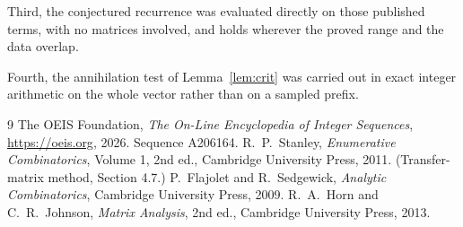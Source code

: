 \documentclass[11pt,a4paper]{article}
\theoremstyle{plain}
\theoremstyle{definition}
\begin{document}
Third, the conjectured recurrence was evaluated directly on those published terms, with no
matrices involved, and holds wherever the proved range and the data overlap.

Fourth, the annihilation test of Lemma~\ref{lem:crit} was carried out in exact integer
arithmetic on the whole vector rather than on a sampled prefix.

\begin{thebibliography}{9}
 The OEIS Foundation, \emph{The On-Line Encyclopedia of Integer
Sequences}, \url{https://oeis.org}, 2026. Sequence A206164.
 R.~P.~Stanley, \emph{Enumerative Combinatorics}, Volume 1, 2nd ed.,
Cambridge University Press, 2011. (Transfer-matrix method, Section 4.7.)
 P.~Flajolet and R.~Sedgewick, \emph{Analytic Combinatorics}, Cambridge
University Press, 2009.
 R.~A.~Horn and C.~R.~Johnson, \emph{Matrix Analysis}, 2nd ed., Cambridge
University Press, 2013.
\end{thebibliography}
\end{document}
